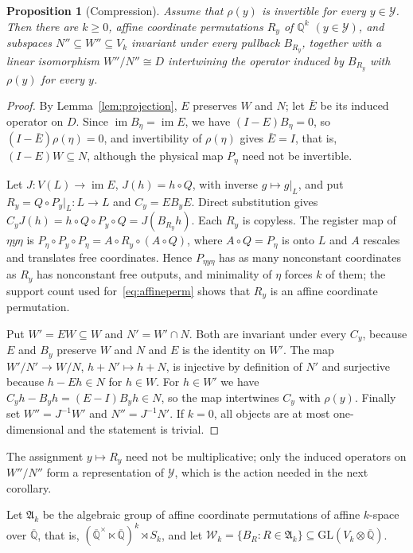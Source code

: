\documentclass[11pt,letterpaper]{article}
\newcommand{\Q}{\mathbb{Q}}
\newcommand{\Qb}{\overline{\mathbb{Q}}}
\newcommand{\cW}{\mathcal{W}}
\newcommand{\cY}{\mathcal{Y}}
\newcommand{\im}{\operatorname{im}}
\newcommand{\GL}{\mathrm{GL}}
\newtheorem{proposition}[theorem]{Proposition}
\theoremstyle{definition}
\begin{document}
\begin{proposition}[Compression]\label{prop:compression}
Assume that $\rho(y)$ is invertible for every $y\in\cY$. Then there are $k\ge0$, affine coordinate permutations $R_y$ of $\Q^k$ $(y\in\cY)$, and subspaces $N''\subseteq W''\subseteq V_k$ invariant under every pullback $B_{R_y}$, together with a linear isomorphism $W''/N''\cong D$ intertwining the operator induced by $B_{R_y}$ with $\rho(y)$ for every $y$.
\end{proposition}
\begin{proof}
By Lemma~\ref{lem:projection}, $E$ preserves $W$ and $N$; let $\bar E$ be its induced operator on $D$. Since $\im B_{\eta}=\im E$, we have $(I-E)B_{\eta}=0$, so $(I-\bar E)\rho(\eta)=0$, and invertibility of $\rho(\eta)$ gives $\bar E=I$, that is, $(I-E)W\subseteq N$, although the physical map $P_{\eta}$ need not be invertible.

Let $J:V(L)\to\im E$, $J(h)=h\circ Q$, with inverse $g\mapsto g|_L$, and put $R_y=Q\circ P_y|_L:L\to L$ and $C_y=EB_yE$. Direct substitution gives $C_yJ(h)=h\circ Q\circ P_y\circ Q=J(B_{R_y}h)$. Each $R_y$ is copyless. The register map of $\eta y\eta$ is $P_{\eta}\circ P_y\circ P_{\eta}=A\circ R_y\circ(A\circ Q)$, where $A\circ Q=P_{\eta}$ is onto $L$ and $A$ rescales and translates free coordinates. Hence $P_{\eta y\eta}$ has as many nonconstant coordinates as $R_y$ has nonconstant free outputs, and minimality of $\eta$ forces $k$ of them; the support count used for~\eqref{eq:affineperm} shows that $R_y$ is an affine coordinate permutation.

Put $W'=EW\subseteq W$ and $N'=W'\cap N$. Both are invariant under every $C_y$, because $E$ and $B_y$ preserve $W$ and $N$ and $E$ is the identity on $W'$. The map $W'/N'\to W/N$, $h+N'\mapsto h+N$, is injective by definition of $N'$ and surjective because $h-Eh\in N$ for $h\in W$. For $h\in W'$ we have $C_yh-B_yh=(E-I)B_yh\in N$, so the map intertwines $C_y$ with $\rho(y)$. Finally set $W''=J^{-1}W'$ and $N''=J^{-1}N'$. If $k=0$, all objects are at most one-dimensional and the statement is trivial.
\end{proof}
The assignment $y\mapsto R_y$ need not be multiplicative; only the induced operators on $W''/N''$ form a representation of $\cY$, which is the action needed in the next corollary.

Let $\mathfrak A_k$ be the algebraic group of affine coordinate permutations of affine $k$-space over $\Qb$, that is, $(\Qb^\times\ltimes\Qb)^k\rtimes S_k$, and let $\cW_k=\{B_R:R\in\mathfrak A_k\}\subseteq\GL(V_k\otimes\Qb)$.
\end{document}
